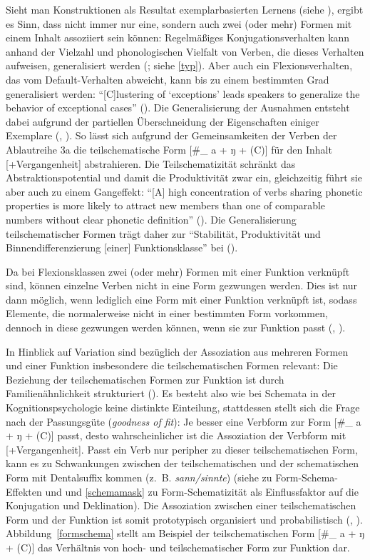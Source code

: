 Sieht man Konstruktionen als Resultat exemplarbasierten Lernens (siehe ), ergibt es Sinn, dass nicht immer nur eine, sondern auch zwei (oder mehr) Formen mit einem Inhalt assoziiert sein können: Regelmäßiges Konjugationsverhalten kann anhand der Vielzahl und phonologischen Vielfalt von Verben, die dieses Verhalten aufweisen, generalisiert werden (\cite[67--68]{Goldberg.2019}; siehe \ref{typ}). Aber auch ein Flexionsverhalten, das vom Default-Verhalten abweicht, kann bis zu einem bestimmten Grad generalisiert werden: "`[C]lustering of `exceptions' leads speakers to generalize the behavior of exceptional cases"' (\cite[93]{Goldberg.2019}).  Die Generalisierung der Ausnahmen entsteht dabei aufgrund der partiellen Überschneidung der Eigenschaften einiger Exemplare (\cite[171]{Bybee.2007}, \cite[121]{Goldberg.2019}). So lässt sich aufgrund der Gemeinsamkeiten der Verben der Ablautreihe 3a die teilschematische Form [\#\_ a + ŋ + (C)] für den Inhalt [+Vergangenheit] abstrahieren. Die Teilschematizität schränkt das Abstraktionspotential und damit die Produktivität zwar ein, gleichzeitig führt sie aber auch zu einem Gangeffekt: "`[A] high concentration of verbs sharing phonetic properties is more likely to attract new members than one of comparable numbers without clear phonetic definition"' (\cite[69]{Bybee.2010}). Die Generalisierung teilschematischer Formen trägt daher zur "`Stabilität, Produktivität und Binnendifferenzierung [einer] Funktionsklasse"' bei (\cite[449]{Bucker.2015}). 

 
Da bei Flexionsklassen zwei (oder mehr) Formen mit einer Funktion verknüpft sind, können einzelne Verben nicht in eine Form gezwungen werden. Dies ist nur dann möglich, wenn lediglich eine Form mit einer Funktion verknüpft ist, sodass Elemente, die normalerweise nicht in einer bestimmten Form vorkommen, dennoch in diese gezwungen werden können, wenn sie zur Funktion passt (\cite[198]{Taylor.1998}, \cite[37]{Goldberg.2019}).

In Hinblick auf Variation sind bezüglich der Assoziation aus mehreren Formen und einer Funktion insbesondere die teilschematischen Formen relevant: Die Beziehung der teilschematischen Formen zur Funktion ist durch Familienähnlichkeit strukturiert (\cite[263]{Bybee.1983}). Es besteht also wie bei Schemata in der Kognitionspsychologie keine distinkte Einteilung, stattdessen stellt sich die Frage nach der Passungsgüte (\textit{goodness of fit}): Je besser eine Verbform zur Form [\#\_ a + ŋ + (C)] passt, desto wahrscheinlicher ist die Assoziation der Verbform mit [+Vergangenheit]. Passt ein Verb nur peripher zu dieser teilschematischen Form, kann es zu Schwankungen zwischen der teilschematischen und der schematischen Form mit Dentalsuffix kommen (z.~B. \textit{sann/sinnte}) (siehe  zu Form-Schema-Effekten und  und \ref{schemamask} zu Form-Schematizität als Einflussfaktor auf die Konjugation und Deklination). Die Assoziation zwischen einer teilschematischen Form und der Funktion ist somit prototypisch organisiert und probabilistisch (\cite[39]{Rumelhart.1980}, \cite[262--264]{Bybee.1983}). Abbildung~\ref{formschema} stellt am Beispiel der teilschematischen Form [\#\_ a + ŋ + (C)] das Verhältnis von hoch- und teilschematischer Form zur Funktion dar.  


